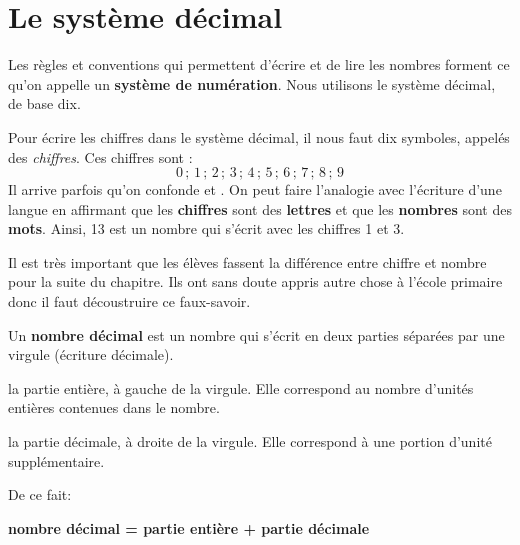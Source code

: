 \section{Le système décimal}

Les règles et conventions qui permettent d'écrire et de lire les nombres forment ce qu'on appelle un \textbf{système de numération}. Nous utilisons le système décimal, de base dix.

\begin{aconnaitre}
Pour écrire les chiffres dans le système décimal, il nous faut dix symboles, appelés des \emph{chiffres}. Ces chiffres sont :
\[ 0\,;\,1\,;\,2\,;\,3\,;\,4\,;\,5\,;\,6\,;\,7\,;\,8\,;\,9  \]
Il arrive parfois qu'on confonde \textbf{} et \textbf{}. On peut faire l'analogie avec l'écriture d'une langue en affirmant que les \textbf{\textcolor{H1}{chiffres}} sont des \textbf{\textcolor{H1}{lettres}} et que les \textbf{\textcolor{H1}{nombres}} sont des \textbf{\textcolor{H1}{mots}}. Ainsi, 13 est un nombre qui s'écrit avec les chiffres 1 et 3.
\end{aconnaitre}

\prof
{Il est très important que les élèves fassent la différence entre chiffre et nombre pour la suite du chapitre. Ils ont sans doute appris autre chose à l'école primaire donc il faut découstruire ce faux-savoir.}

Un \textbf{\textcolor{C2}{nombre décimal}} est un nombre qui s'écrit en deux parties séparées par une virgule (écriture décimale).

\hspace{2em}\textbullet\hspace{.25em} la partie entière, à gauche de la virgule. Elle correspond au nombre d'unités entières contenues dans le nombre.

\hspace{2em}\textbullet\hspace{.25em} la partie décimale, à droite de la virgule. Elle correspond à une portion d'unité supplémentaire.

De ce fait:

\begin{center}
\textbf{\textcolor{C2}{nombre décimal = partie entière + partie décimale}}
\end{center}

